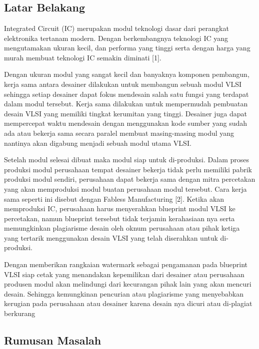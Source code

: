 \chapter{\babSatu}

\section{Latar Belakang}

Integrated Circuit (IC) merupakan modul teknologi dasar dari perangkat
elektronika tertanam modern. Dengan berkembangnya teknologi IC yang
mengutamakan ukuran kecil, dan performa yang tinggi serta dengan harga yang murah membuat teknologi IC semakin diminati [1].

Dengan ukuran modul yang sangat kecil dan banyaknya komponen pembangun, kerja sama antara desainer dilakukan untuk membangun sebuah
modul VLSI sehingga setiap desainer dapat fokus mendesain salah satu fungsi yang terdapat dalam modul tersebut. Kerja sama dilakukan untuk mempermudah pembuatan desain VLSI yang memiliki tingkat kerumitan yang tinggi. Desainer juga dapat mempercepat waktu mendesain dengan menggunakan kode sumber yang sudah ada atau bekerja sama secara paralel membuat masing-masing modul yang nantinya akan digabung menjadi sebuah modul utama VLSI.

Setelah modul selesai dibuat maka modul siap untuk di-produksi. Dalam
proses produksi modul perusahaan tempat desainer bekerja tidak perlu memiliki pabrik produksi modul sendiri, perusahaan dapat bekerja sama dengan mitra percetakan yang akan memproduksi modul buatan perusahaan modul tersebut. Cara kerja sama seperti ini disebut dengan Fabless Manufacturing [2]. Ketika akan memproduksi IC, perusahaan harus menyerahkan blueprint modul VLSI ke percetakan, namun blueprint tersebut tidak terjamin kerahasiaan nya serta memungkinkan plagiarisme desain oleh oknum perusahaan atau pihak ketiga yang
tertarik menggunakan desain VLSI yang telah diserahkan untuk di-produksi.

Dengan memberikan rangkaian watermark sebagai pengamanan pada
blueprint VLSI siap cetak yang menandakan kepemilikan dari desainer atau perusahaan produsen modul akan melindungi dari kecurangan pihak lain yang akan mencuri desain. Sehingga kemungkinan pencurian atau plagiarisme yang menyebabkan kerugian pada perusahaan atau desainer karena desain nya dicuri atau di-plagiat berkurang

\section{Rumusan Masalah}

